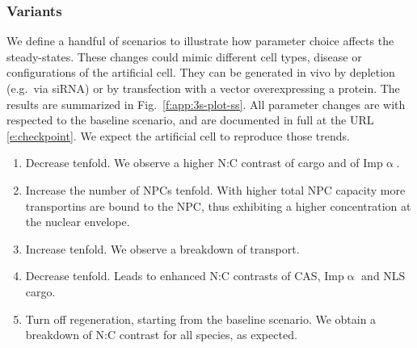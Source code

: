 \documentclass[12pt,notitlepage]{article}
\begin{document}
%

\subsubsection*{Variants}

We define a handful of scenarios 
to illustrate how 
parameter choice affects 
the steady-states.
%
These changes could mimic
different cell types, disease
or
configurations of the artificial cell.
%
They can be generated in vivo
by depletion (e.g.~via siRNA)
or 
by transfection with a vector overexpressing a protein.
%
%
The results are summarized in Fig.~\ref{f:app:3s-plot-ss}.
%
%
All parameter changes are
with respected 
to the baseline scenario,
and are documented in full at the URL \eqref{e:checkpoint}.
%
%
%
We expect the artificial cell 
to reproduce those trends.



\begin{enumerate}
\item 
	Decrease  tenfold.
	We observe a higher N:C contrast of cargo and of Imp$\upalpha$.
	
\item
	Increase the number of NPCs tenfold.
	With higher total NPC capacity
	more transportins are bound to the NPC,
	thus exhibiting a higher concentration
	at the nuclear envelope.
	
	
\item
	Increase  tenfold.
	We observe a breakdown of transport.

\item
	Decrease  tenfold.
	Leads to enhanced N:C contrasts
	of CAS, Imp$\upalpha$ and NLS cargo.
	
\item
	Turn off  regeneration,
	starting from the baseline scenario.
	We obtain a breakdown of N:C contrast
	for all species,
	as expected.
\end{enumerate}
\end{document}
